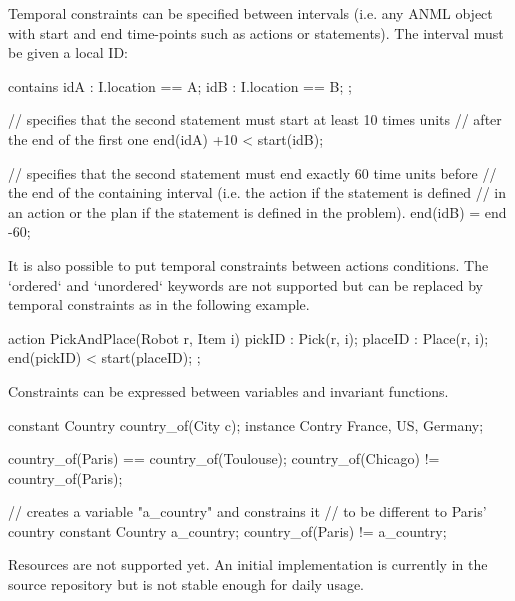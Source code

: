 
Temporal constraints can be specified between intervals (i.e. any ANML object
with start and end time-points such as actions or statements).
The interval must be given a local ID:

\begin{anmlcode}
  [all] contains {
      idA : I.location == A;
      idB : I.location == B;
  };
  
  // specifies that the second statement must start at least 10 times units
  // after the end of the first one
  end(idA) +10 < start(idB);
  
  // specifies that the second statement must end exactly 60 time units before
  // the end of the containing interval (i.e. the action if the statement is defined
  // in an action or the plan if the statement is defined in the problem).
  end(idB) = end -60;
\end{anmlcode}


It is also possible to put temporal constraints between actions conditions. The `ordered` and `unordered` keywords are not supported but can be replaced by temporal constraints as in the following example.

\begin{anmlcode}
  action PickAndPlace(Robot r, Item i) {
    pickID : Pick(r, i);
    placeID : Place(r, i);
    end(pickID) < start(placeID);
  };
\end{anmlcode}


Constraints can be expressed between variables and invariant functions.
\begin{anmlcode}
  
  constant Country country_of(City c);
  instance Contry France, US, Germany;
  
  country_of(Paris) == country_of(Toulouse);
  country_of(Chicago) != country_of(Paris);
  
  // creates a variable "a_country" and constrains it
  // to be different to Paris' country
  constant Country a_country;
  country_of(Paris) != a_country;
\end{anmlcode}


Resources are not supported yet. An initial implementation is currently in the source repository but is not stable enough for daily usage.





